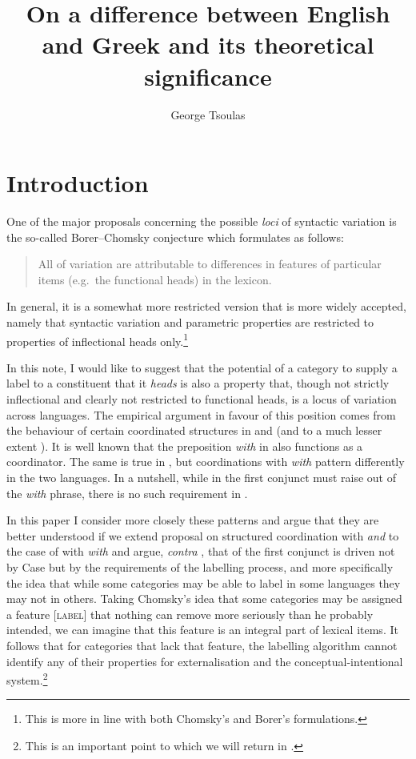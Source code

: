 \documentclass[output=paper]{langsci/langscibook}
\author{George Tsoulas\affiliation{University of York}}
\title{On a difference between English and Greek and its theoretical significance}
\begin{document}
\glsresetall

\section{Introduction}

One of the major proposals concerning the possible \emph{loci} of syntactic
variation is the so-called Borer--Chomsky conjecture
which \citet{Baker2008b} formulates as follows:

\begin{quote}
All  of variation are attributable to differences in features of
particular items (e.g.\ the functional heads) in the lexicon.
\end{quote}

In general, it is a somewhat more restricted version that is more widely
accepted, namely that syntactic variation and parametric properties are
restricted to properties of inflectional heads only.\footnote{This is more in
line with both Chomsky's and Borer's formulations.}

In this note, I would like to suggest that the potential of a category to
supply a label to a constituent that it \emph{heads} is also a property that,
though not strictly inflectional and clearly not restricted to functional
heads, is a locus of variation across languages. The empirical argument in
favour of this position comes from the behaviour of certain coordinated
structures in  and  (and to a much lesser extent
). It is well known that the preposition \emph{with} in
 also functions as a coordinator. The same is true in ,
but coordinations with \emph{with} pattern differently in the two languages. In
a nutshell, while in  the first conjunct must raise out of the
\emph{with} phrase, there is no such requirement in .

In this paper I consider more closely these patterns and argue that they are
better understood if we extend  proposal on structured
coordination with \emph{and} to the case of  with \emph{with}
and argue, \emph{contra} \citet{Kayne1994}, that  of the first
conjunct is driven not by Case but by the requirements of the
labelling process, and more specifically the idea that while some
categories may be able to label in some languages they may not in others.
Taking Chomsky's idea that some categories may be assigned a feature [\textsc{label}]
that nothing can remove more seriously than he probably intended, we can
imagine that this feature is an integral part of lexical items. It follows that
for categories that lack that feature, the labelling algorithm cannot identify
any of their properties for externalisation and the conceptual-intentional
system.\footnote{This is an important point to which we will return in
.}
\end{document}
